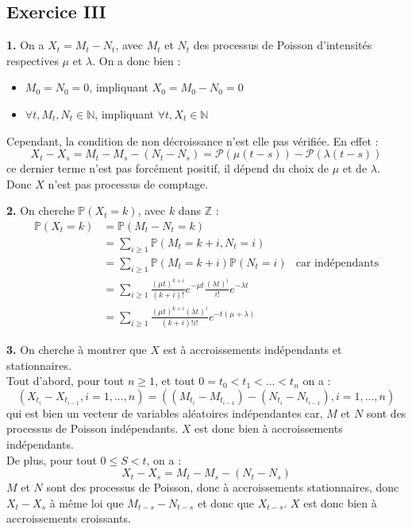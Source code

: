 \documentclass[a4paper,10pt]{report}
\newcommand{\proba}[1]{\mathbb{P} \left(#1\right)} %
\begin{document}

\subsection*{Exercice III}


\textbf{1.} On a $X_t = M_t - N_t$, avec $M_t$ et $N_t$ des processus de Poisson d'intensités respectives $\mu$ et $ \lambda$. On a donc bien :
\begin{itemize}
	\item $M_0 = N_0 = 0$, impliquant $X_0 = M_0 - N_0 = 0$
	\item $\forall t, M_t, N_t \in \mathbb{N}$, impliquant $ \forall t, X_t \in \mathbb{N}$
\end{itemize}
Cependant, la condition de non décroissance n'est elle pas vérifiée. En effet :
$$
X_t - X_s = M_t - M_s - (N_t - N_s) = \mathcal{P}(\mu(t-s)) - \mathcal{P}(\lambda(t-s))
$$
ce dernier terme n'est pas forcément positif, il dépend du choix de $\mu$ et de $\lambda$.
Donc $X$ n'est pas processus de comptage.
\newline


\textbf{2.} On cherche $\proba{X_t = k}$, avec $k$ dans $\mathbb{Z}$ :
$$
\begin{aligned}
\proba{X_t = k} & = \proba{M_t - N_t = k} \\
& = \sum_{i \geq 1} \proba{M_t = k +i, N_t = i}\\
& = \sum_{i \geq 1} \proba{M_t = k +i} \proba{N_t = i} & \text{car indépendants}\\
& = \sum_{i \geq 1} \frac{(\mu t)^{k + i}}{(k +i) !} e^{-\mu t} \frac{(\lambda t)^{i}}{i !} e^{-\lambda t} \\
& = \sum_{i \geq 1} \frac{(\mu t)^{k + i} (\lambda t)^{i}}{(k+i) ! i !}  e^{-t(\mu + \lambda)}
\end{aligned}
$$
\newline


\textbf{3.} On cherche à montrer que $X$ est à accroissements indépendants et stationnaires.\\
Tout d'abord, pour tout $n \geq 1$, et tout $0 = t_0 < t_1 < ... < t_n$ on a :
$$
(X_{t_i} - X_{t_{i-1}} , i = 1,...,n) = \left( (M_{t_i} - M_{t_{i-1}}) - ( N_{t_i} -N_{t_{i-1}}), i = 1,...,n \right)
$$ 
qui est bien un vecteur de variables aléatoires indépendantes car, $M$ et $N$ sont des processus de Poisson indépendants. $X$ est donc bien à accroissements indépendants. \\
De plus, pour tout $0 \leq S < t$, on a :
$$
X_t - X_s = M_t - M_s - (N_t - N_s)
$$
$M$ et $N$ sont des processus de Poisson, donc à accroissements stationnaires, donc $X_t - X_s$ à même loi que $M_{t-s} - N_{t-s}$ et donc que $X_{t-s}$. $X$ est donc bien à accroissements croissants.
\newline
\end{document}
